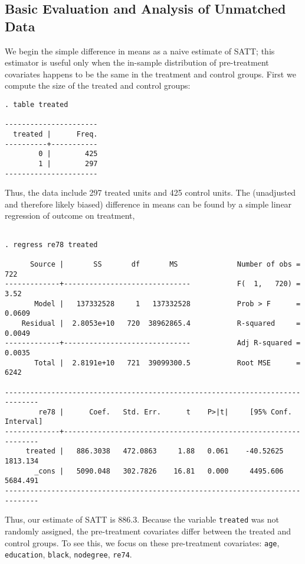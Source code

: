 \documentclass[11pt,titlepage]{article}
\begin{document}
\subsection{Basic Evaluation and Analysis of Unmatched Data}\label{s:basic}

We begin the simple difference in means as a naive estimate of SATT;
this estimator is useful only when the in-sample distribution of
pre-treatment covariates happens to be the same in the treatment and
control groups. First we compute the size of the treated and control
groups:

\begin{verbatim}
. table treated

----------------------
  treated |      Freq.
----------+-----------
        0 |        425
        1 |        297
----------------------

\end{verbatim}


Thus, the data include 297 treated units and 425 control units.  The
(unadjusted and therefore likely biased) difference in means can be found
by a simple linear regression of outcome on treatment,

\begin{verbatim}

. regress re78 treated

      Source |       SS       df       MS              Number of obs =     722
-------------+------------------------------           F(  1,   720) =    3.52
       Model |   137332528     1   137332528           Prob > F      =  0.0609
    Residual |  2.8053e+10   720  38962865.4           R-squared     =  0.0049
-------------+------------------------------           Adj R-squared =  0.0035
       Total |  2.8191e+10   721  39099300.5           Root MSE      =    6242

------------------------------------------------------------------------------
        re78 |      Coef.   Std. Err.      t    P>|t|     [95% Conf. Interval]
-------------+----------------------------------------------------------------
     treated |   886.3038   472.0863     1.88   0.061    -40.52625    1813.134
       _cons |   5090.048   302.7826    16.81   0.000     4495.606    5684.491
------------------------------------------------------------------------------

\end{verbatim}


Thus, our estimate of SATT is 886.3. Because the variable \texttt{treated} was
not randomly assigned, the pre-treatment covariates differ between the
treated and control groups.  To see this, we focus on these pre-treatment
covariates: \texttt{age}, \texttt{education}, \texttt{black},
\texttt{nodegree}, \texttt{re74}.
\end{document}
